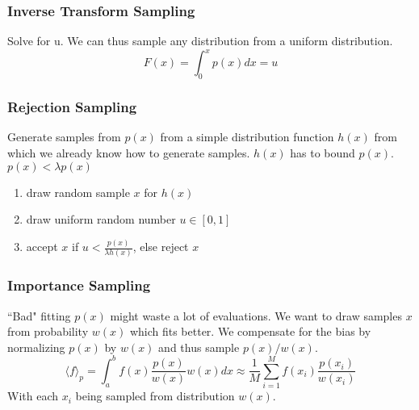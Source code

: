    \subsubsection{Inverse Transform Sampling}
        Solve for u. We can thus sample any distribution from a uniform distribution.
        \begin{equation*}
            F(x) = \int_0^x p(x)dx = u
        \end{equation*}
    
    \subsubsection{Rejection Sampling}
        Generate samples from $p(x)$ from a simple distribution function $h(x)$ from which we already know how to generate samples. $h(x)$ has to bound $p(x)$. $p(x) < \lambda p(x)$
        \begin{enumerate}
            \item draw random sample $x$ for $h(x)$
            \item draw uniform random number $u\in[0,1]$
            \item accept $x$ if $u < \frac{p(x)}{\lambda h(x)}$, else reject $x$
        \end{enumerate}
    
    \subsubsection{Importance Sampling}
        ``Bad" fitting $p(x)$ might waste a lot of evaluations. We want to draw samples $x$ from probability $w(x)$ which fits better. We compensate for the bias by normalizing $p(x)$ by $w(x)$ and thus sample $p(x)/w(x)$.
        \begin{equation*}
            \langle f \rangle_p = \int_a^b f(x)\frac{p(x)}{w(x)}w(x)dx \approx \frac{1}{M}\sum_{i=1}^M f(x_i)\frac{p(x_i)}{w(x_i)}
        \end{equation*}
        With each $x_i$ being sampled from distribution $w(x)$.
    
